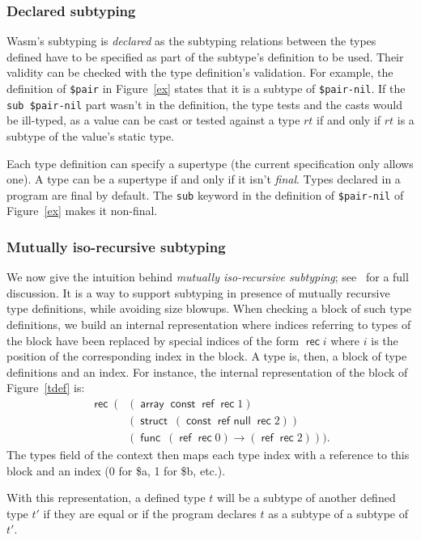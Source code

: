 \documentclass[a4paper,11pt]{article}
\DeclareMathOperator{\reft}{\textsf{ref}}
\DeclareMathOperator{\rect}{\textsf{rec}}
\DeclareMathOperator{\strt}{\textsf{struct}}
\DeclareMathOperator{\arrt}{\textsf{array}}
\DeclareMathOperator{\funt}{\textsf{func}}
\DeclareMathOperator{\cstt}{\textsf{const}}
\DeclareMathOperator{\refnullt}{\textsf{ref null}}
\begin{document}
\subsubsection{Declared subtyping}
Wasm's subtyping is \emph{declared} as the subtyping relations between the types
defined have to be specified as part of the subtype's definition to be used.
Their validity can be checked with the type definition's validation. For
example, the definition of \texttt{\$pair} in Figure~\ref{ex} states that it is
a subtype of \texttt{\$pair-nil}. If the \texttt{sub \$pair-nil} part wasn't in
the definition, the type tests and the casts would be ill-typed, as a value can
be cast or tested against a type $rt$ if and only if $rt$ is a subtype of the
value's static type.

Each type definition can specify a supertype (the current specification only
allows one). A type can be a supertype if and only if it isn't \emph{final}.
Types declared in a program are final by default. The \texttt{sub} keyword in
the definition of \texttt{\$pair-nil} of Figure~\ref{ex} makes it non-final.

\subsubsection{Mutually iso-recursive subtyping}\label{deft}
We now give the intuition behind \emph{mutually iso-recursive subtyping};
see~\cite{rossberg2023mutually} for a full discussion. It is a way to support
subtyping in presence of mutually recursive type definitions, while avoiding
size blowups. When checking a block of such type definitions, we build an
internal representation where indices referring to types of the block have been
replaced by special indices of the form $\rect i$ where $i$ is the position of
the corresponding index in the block. A type is, then, a block of type
definitions and an index. For instance, the internal representation of the block
of Figure~\ref{tdef} is:
\begin{align*}
\rect\ (& (\arrt \cstt\reft \rect 1)\\
&(\strt\ (\cstt \refnullt \rect 2))\\
&(\funt\ (\reft \rect 0)\to (\reft \rect 2))).
\end{align*}
The \textsf{types} field of the context then maps each type index with a
reference to this block and an index (0 for \textsf{\$a}, 1 for \textsf{\$b},
etc.).

With this representation, a defined type $t$ will be a subtype of another
defined type $t'$ if they are equal or if the program declares $t$ as a subtype
of a subtype of $t'$.
\end{document}
